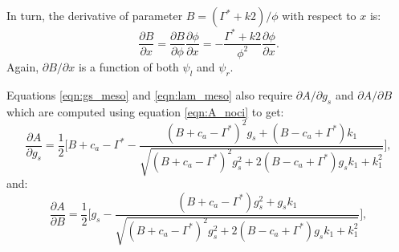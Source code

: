 \documentclass[utf8]{frontiersSCNS} %
\begin{document}
In turn, the derivative of parameter $B = (\Gamma^* + k2) / \phi$ with respect to $x$ is:
\begin{equation}
    \label{eqn:B_x}
    \frac{\partial B}{\partial x} = \frac{\partial B}{\partial \phi} \frac{\partial \phi}{\partial x} = -\frac{\Gamma^* + k2}{\phi^2} \frac{\partial \phi}{\partial x}.
\end{equation}
Again, $\partial B / \partial x$ is a function of both $\psi_l$ and $\psi_r$.

Equations \ref{eqn:gs_meso} and \ref{eqn:lam_meso} also require $\partial A / \partial g_s$ and $\partial A / \partial B$ which are computed using equation \ref{eqn:A_noci} to get:
\begin{equation}
    \label{eqn:A_gs}
    \frac{\partial A}{\partial g_s} = \frac{1}{2}\Bigg[B + c_a - \Gamma^* - \frac{(B + c_a - \Gamma^*)^2 g_s + (B - c_a + \Gamma^*) k_1}{ \sqrt{(B + c_a - \Gamma^*)^2 g_s^2 + 2 (B - c_a + \Gamma^*) g_s k_1 + k_1^2}} \Bigg],
\end{equation}
and:
\begin{equation}
    \label{eqn:A_B}
    \frac{\partial A}{\partial B} = \frac{1}{2}\Bigg[g_s - \frac{(B + c_a - \Gamma^*) g_s^2 + g_s k_1}{ \sqrt{(B + c_a - \Gamma^*)^2 g_s^2 + 2 (B - c_a + \Gamma^*) g_s k_1 + k_1^2}} \Bigg],
\end{equation}





\end{document}
